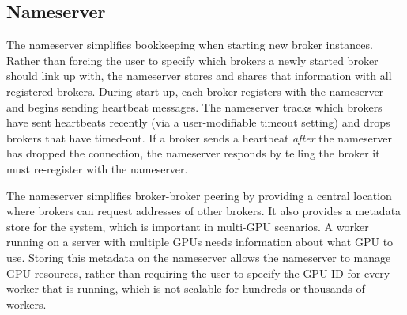 \documentclass[conference]{IEEEtran}
\begin{document}
\subsection{Nameserver}
The nameserver simplifies bookkeeping when starting new broker instances.
Rather than forcing the user to specify which brokers a newly started broker
should link up with, the nameserver stores and shares that information with all
registered brokers. During start-up, each broker registers with the nameserver
and begins sending heartbeat messages. The nameserver tracks which brokers have
sent heartbeats recently (via a user-modifiable timeout setting) and drops
brokers that have timed-out. If a broker sends a heartbeat \emph{after} the
nameserver has dropped the connection, the nameserver responds by telling the
broker it must re-register with the nameserver.

The nameserver simplifies broker-broker peering by providing a central location
where brokers can request addresses of other brokers. It also provides a metadata
store for the system, which is important in multi-GPU scenarios. A worker running
on a server with multiple GPUs needs information about what GPU to use. Storing
this metadata on the nameserver allows the nameserver to manage GPU resources,
rather than requiring the user to specify the GPU ID for every worker that is
running, which is not scalable for hundreds or thousands of workers.
\end{document}
